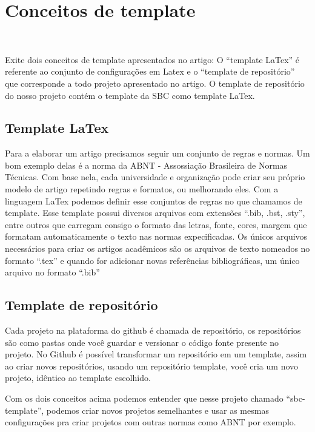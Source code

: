 \section{Conceitos de template}~\label{sec:template}

Exite dois conceitos de template apresentados no artigo: O ``template LaTex'' é referente ao conjunto de configurações em Latex e o ``template de repositório'' que corresponde a todo projeto apresentado no artigo. O template de repositório do nosso projeto contém o template da SBC como template LaTex.

\subsection{Template LaTex}
Para a elaborar um artigo precisamos seguir um conjunto de regras e normas. Um bom exemplo delas é a norma da ABNT - Assossiação Brasileira de Normas Técnicas. Com base nela, cada universidade e organização pode criar seu próprio modelo de artigo repetindo regras e formatos, ou melhorando eles. Com a linguagem LaTex podemos definir esse conjuntos de regras no que chamamos de template. Esse template possui diversos arquivos com extensões ``.bib, .bst, .sty'', entre outros que carregam consigo o formato das letras, fonte, cores, margem que formatam automaticamente o texto nas normas expecificadas. Os únicos arquivos necessários para criar os artigos acadêmicos são os arquivos de texto nomeados no formato ``.tex'' e quando for adicionar novas referências bibliográficas, um único arquivo no formato ``.bib''

\subsection{Template de repositório}
Cada projeto na plataforma do github é chamada de repositório, os repositórios são como pastas onde você guardar e versionar o código fonte presente no projeto. No Github é possível transformar um repositório em um template, assim ao criar novos repositórios, usando um repositório template, você cria um novo projeto, idêntico ao template escolhido.


Com os dois conceitos acima podemos entender que nesse projeto chamado ``sbc-template'', podemos criar novos projetos semelhantes e usar as mesmas configurações pra criar projetos com outras normas como ABNT por exemplo.